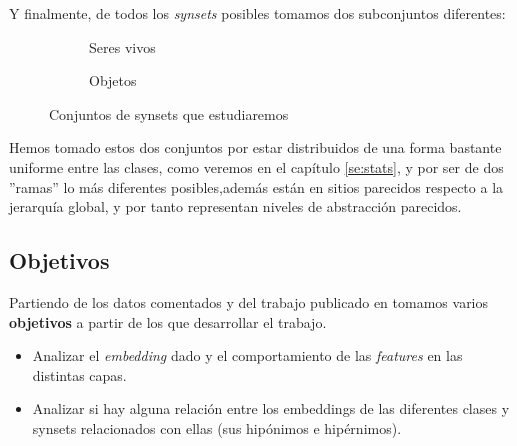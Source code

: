 \documentclass[12,twoside]{TFG-GM}
\theoremstyle{definition}
\theoremstyle{remark}
\begin{document}
Y finalmente, de todos los \textit{synsets} posibles tomamos dos subconjuntos diferentes: 

\begin{figure}[H]
\centering
\begin{subfigure}{.5\textwidth}
  \centering
  \caption{Seres vivos}
  \label{fig:sub1}
\end{subfigure}%
\begin{subfigure}{.5\textwidth}
  \centering
  \caption{Objetos}
  \label{fig:sub2}
\end{subfigure}
\caption{Conjuntos de synsets que estudiaremos \label{fig:synsets}}

\end{figure}

Hemos tomado estos dos conjuntos por estar distribuidos de una forma bastante uniforme entre las clases, como veremos en el capítulo \ref{se:stats}, y por ser de dos ''ramas'' lo más diferentes posibles,además están en sitios parecidos respecto a la jerarquía global, y por tanto representan niveles de abstracción parecidos. 

 
\subsection{Objetivos}
Partiendo de los datos comentados y del trabajo publicado en \cite{fne} tomamos varios \textbf{objetivos} a partir de los que desarrollar el trabajo.

\begin{itemize}
\item Analizar el \textit{embedding} dado y el comportamiento de las \textit{features} en las distintas capas. 
\item Analizar si hay alguna relación entre los embeddings de las diferentes clases y synsets relacionados con ellas (sus hipónimos e hipérnimos). 
\end{itemize}
\end{document}
